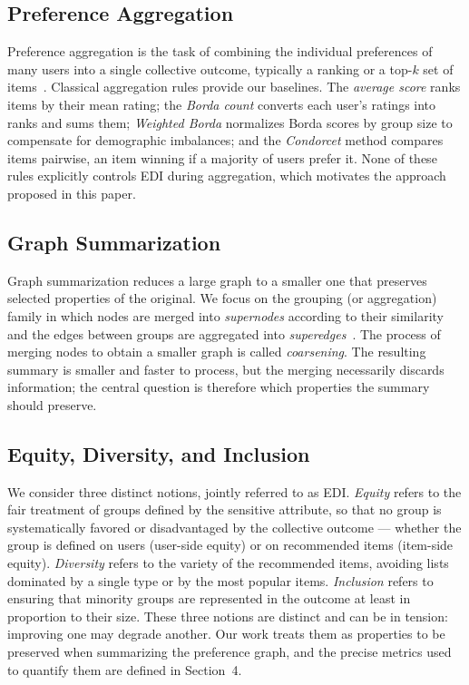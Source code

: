 \documentclass[runningheads]{llncs}
\begin{document}
\subsection{Preference Aggregation}

Preference aggregation is the task of combining the individual preferences
of many users into a single collective outcome, typically a ranking or a
top-$k$ set of items~\cite{ricci2011recommender}. Classical aggregation
rules provide our baselines. The \emph{average score} ranks items by their
mean rating; the \emph{Borda count} converts each user's ratings into ranks
and sums them; \emph{Weighted Borda} normalizes Borda scores by group size
to compensate for demographic imbalances; and the \emph{Condorcet} method
compares items pairwise, an item winning if a majority of users prefer it.
None of these rules explicitly controls EDI during aggregation, which
motivates the approach proposed in this paper.

\subsection{Graph Summarization}

Graph summarization reduces a large graph to a smaller one that preserves
selected properties of the original. We focus on the grouping (or
aggregation) family in which nodes are merged into \emph{supernodes}
according to their similarity and the edges between groups are aggregated
into \emph{superedges}~\cite{liu_graph_2018}. The process of merging nodes
to obtain a smaller graph is called \emph{coarsening}. The resulting summary
is smaller and faster to process, but the merging necessarily discards
information; the central question is therefore which properties the summary
should preserve.

\subsection{Equity, Diversity, and Inclusion}

We consider three distinct notions, jointly referred to as EDI. \emph{Equity}
refers to the fair treatment of groups defined by the sensitive attribute,
so that no group is systematically favored or disadvantaged by the collective
outcome --- whether the group is defined on users (user-side equity) or on
recommended items (item-side equity). \emph{Diversity} refers to the variety
of the recommended items, avoiding lists dominated by a single type or by
the most popular items. \emph{Inclusion} refers to ensuring that minority
groups are represented in the outcome at least in proportion to their size.
These three notions are distinct and can be in tension: improving one may
degrade another. Our work treats them as properties to be preserved when
summarizing the preference graph, and the precise metrics used to quantify
them are defined in Section~4.
\end{document}

